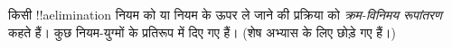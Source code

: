 \documentclass[../../../include/open-logic-section]{subfiles}
\begin{document}
किसी !!a{elimination} नियम को \Elim{\lor} या \Elim{\lexists} नियम के ऊपर ले
जाने की प्रक्रिया को \emph{क्रम-विनिमय रूपांतरण} कहते हैं। कुछ नियम-युग्मों
के प्रतिरूप  में दिए गए हैं। (शेष अभ्यास
के लिए छोड़े गए हैं।)

\end{document}
